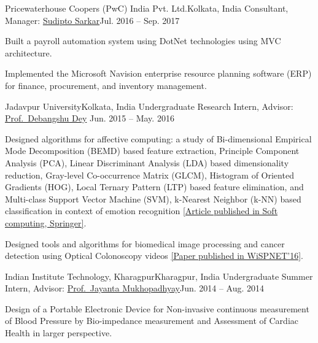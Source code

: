 \documentclass[letterpaper,10pt]{article}
\begin{document}
\resumeSubheading
{Pricewaterhouse Coopers (PwC) India Pvt. Ltd.}{Kolkata, India}
{Consultant, Manager: \href{https://www.linkedin.com/in/sudipt0sarkar/?originalSubdomain=in}{Sudipto Sarkar}}{Jul. 2016 -- Sep. 2017}
\resumeItemListStart
\item {Built a payroll automation system using DotNet technologies using MVC architecture.}
\item {Implemented the Microsoft Navision enterprise resource planning software (ERP) for finance, procurement, and inventory management.}
\resumeItemListEnd

\resumeSubheading
{Jadavpur University}{Kolkata, India}
{Undergraduate Research Intern, Advisor: 
{\href{https://scholar.google.com/citations?hl=en&user=tlzV8CAAAAAJ&view_op=list_works&sortby=pubdate}{Prof.\ Debangshu Dey}}
}{Jun. 2015 -- May. 2016}
\resumeItemListStart
\item {Designed algorithms for affective computing: a study of Bi-dimensional Empirical Mode Decomposition (BEMD) based feature extraction, Principle Component Analysis (PCA), Linear Discriminant Analysis (LDA) based dimensionality reduction, Gray-level Co-occurrence Matrix (GLCM), Histogram of Oriented Gradients (HOG), Local Ternary Pattern (LTP) based feature elimination, and Multi-class Support Vector Machine (SVM), k-Nearest Neighbor (k-NN) based classification in context of emotion recognition \hyperref[sec:pubs]{[Article published in Soft computing, Springer]}}.
\item {Designed tools and algorithms for biomedical image processing and cancer detection using Optical Colonoscopy videos \hyperref[sec:pubs]{[Paper published in WiSPNET'16]}}.
\resumeItemListEnd

\resumeSubheading
{Indian Institute Technology, Kharagpur}{Kharagpur, India}
{Undergraduate Summer Intern, Advisor: \href{http://www.facweb.iitkgp.ac.in/~jay/}{Prof.\ Jayanta Mukhopadhyay}}{Jun. 2014 -- Aug. 2014}
\resumeItemListStart
\item {Design of a Portable Electronic Device for Non-invasive continuous measurement of Blood Pressure by Bio-impedance measurement and Assessment of Cardiac Health in larger perspective.}
\resumeItemListEnd
\resumeSubHeadingListEnd

\end{document}

